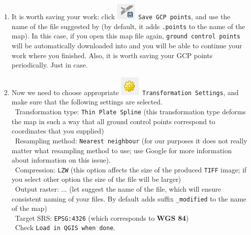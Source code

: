 \documentclass[12pt,oneside]{article}
\begin{document}
\begin{enumerate}
\item It is worth saving your work: click \includegraphics[scale=.5]{qgis_g_savegcp}~\texttt{Save GCP points}, and use the name of the file suggested by \QGIS (by default, it adds \texttt{.points} to the name of the map). In this case, if you open this map file again, \texttt{ground control points} will be automatically downloaded into \QGIS and you will be able to continue your work where you finished. Also, it is worth saving your GCP points periodically. Just in case.

\item Now we need to choose appropriate \includegraphics[scale=.5]{qgis_transformationsettings}~\texttt{Transformation Settings}, and make sure that the following settings are selected.\\
\textbullet~Transformation type: \texttt{Thin Plate Spline} (this transformation type deforms the map in such a way that all ground control points correspond to coordinates that you supplied)\\
\textbullet~Resampling method: \texttt{Nearest neighbour} (for our purposes it does not really matter what resampling method to use; use Google for more information about information on this issue).\\
\textbullet~Compression: \texttt{LZW} (this option affects the size of the produced \texttt{TIFF} image; if you select other option the size of the file will be larger)\\
\textbullet~Output raster: ... (let \QGIS suggest the name of the file, which will ensure consistent naming of your files. By default \QGIS adds suffix \texttt{\_modified} to the name of the map)\\
\textbullet~Target SRS: \texttt{EPSG:4326} (which corresponds to \textbf{WGS 84})\\
\textbullet~Check \texttt{Load in QGIS when done}.\\

\end{enumerate}
\end{document}

